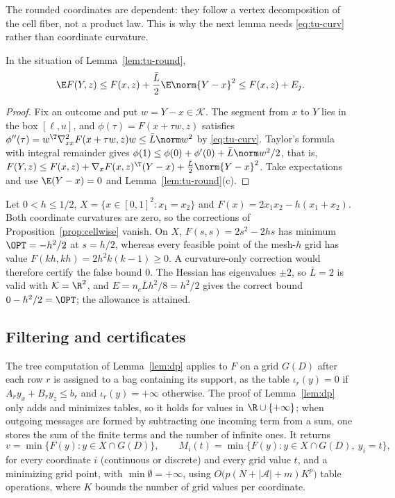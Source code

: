 The rounded coordinates are dependent: they follow a vertex decomposition of
the cell fiber, not a product law. This is why the next lemma needs
\eqref{eq:tu-curv} rather than coordinate curvature.

\begin{lemma}\label{lem:tu-allow}
In the situation of Lemma~\ref{lem:tu-round},
\[
\E F(Y,z)\le F(x,z)+\frac{\bar L}2\E\norm{Y-x}^2\le F(x,z)+E_j .
\]
\end{lemma}

\begin{proof}
Fix an outcome and put $w=Y-x\in\mathcal K$. The segment from $x$ to $Y$ lies
in the box $[\ell,u]$, and $\phi(\tau)=F(x+\tau w,z)$ satisfies
$\phi''(\tau)=w^{\T}\nabla^2_{xx}F(x+\tau w,z)w\le\bar L\norm w^2$ by
\eqref{eq:tu-curv}. Taylor's formula with integral remainder gives
$\phi(1)\le\phi(0)+\phi'(0)+\bar L\norm w^2/2$, that is,
$F(Y,z)\le F(x,z)+\nabla_xF(x,z)^{\T}(Y-x)+\frac{\bar L}2\norm{Y-x}^2$.
Take expectations and use $\E(Y-x)=0$ and Lemma~\ref{lem:tu-round}(c).
\end{proof}

\begin{example}\label{ex:tu-fullcurv}
Let $0<h\le1/2$, $X=\{x\in[0,1]^2:x_1=x_2\}$ and
$F(x)=2x_1x_2-h(x_1+x_2)$. Both coordinate curvatures are zero, so the
corrections of Proposition~\ref{prop:cellwise} vanish. On $X$,
$F(s,s)=2s^2-2hs$ has minimum $\OPT=-h^2/2$ at $s=h/2$, whereas every feasible
point of the mesh-$h$ grid has value $F(kh,kh)=2h^2k(k-1)\ge0$. A
curvature-only correction would therefore certify the false bound $0$. The
Hessian has eigenvalues $\pm2$, so $\bar L=2$ is valid with
$\mathcal K=\R^2$, and $E=n_c\bar Lh^2/8=h^2/2$ gives the correct bound
$0-h^2/2=\OPT$; the allowance is attained.
\end{example}

\subsection{Filtering and certificates}\label{sec:tu-filter}

The tree computation of Lemma~\ref{lem:dp} applies to $F$ on a grid $G(D)$
after each row $r$ is assigned to a bag containing its support, as the table
$\iota_r(y)=0$ if $A_ry_x+B_ry_z\le b_r$ and $\iota_r(y)=+\infty$ otherwise.
The proof of Lemma~\ref{lem:dp} only adds and minimizes tables, so it holds
for values in $\R\cup\{+\infty\}$; when outgoing messages are formed by
subtracting one incoming term from a sum, one stores the sum of the finite
terms and the number of infinite ones. It returns
\[
v=\min\{F(y):y\in X\cap G(D)\},\qquad
M_i(t)=\min\{F(y):y\in X\cap G(D),\ y_i=t\},
\]
for every coordinate $i$ (continuous or discrete) and every grid value $t$,
and a minimizing grid point, with $\min\emptyset=+\infty$, using
$O\bigl(p(N+\lvert\mathcal A\rvert+m)K^p\bigr)$ table operations, where $K$
bounds the number of grid values per coordinate.

